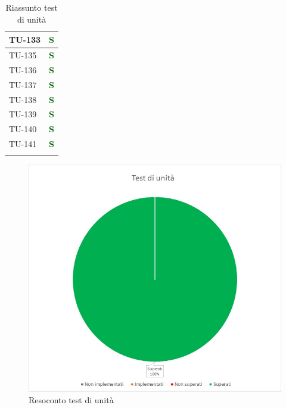 \begin{longtable}{|C{2.5cm}|C{2.5cm}|}
	{TU-133} & \textcolor{darkgreen}{\textbf{S}}\\
	\hline
	{TU-135} & \textcolor{darkgreen}{\textbf{S}}\\
	\hline
	{TU-136} & \textcolor{darkgreen}{\textbf{S}}\\
	\hline
	{TU-137} & \textcolor{darkgreen}{\textbf{S}}\\
	\hline
	{TU-138} & \textcolor{darkgreen}{\textbf{S}}\\
	\hline
	{TU-139} & \textcolor{darkgreen}{\textbf{S}}\\
	\hline
	{TU-140} & \textcolor{darkgreen}{\textbf{S}}\\
	\hline
	{TU-141} & \textcolor{darkgreen}{\textbf{S}}\\
	\hline
	\caption{Riassunto test di unità}
	\label{tabella:riassunto tu}
\end{longtable}
\renewcommand{\arraystretch}{1}
\begin{figure} [H]
	\centering
	\includegraphics[scale=0.7]{Img/TU}
	\caption{Resoconto test di unità}\label{}
\end{figure}


\pagebreak